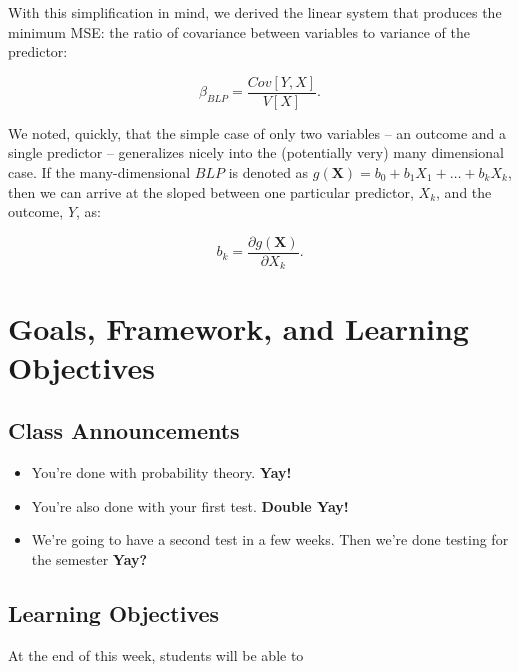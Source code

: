 \documentclass[
]{book}
\providecommand{\tightlist}{%
  \setlength{\itemsep}{0pt}\setlength{\parskip}{0pt}}
\theoremstyle{definition}
\theoremstyle{definition}
\theoremstyle{definition}
\theoremstyle{definition}
\theoremstyle{remark}
\begin{document}
With this simplification in mind, we derived the linear system that produces the minimum MSE: the ratio of covariance between variables to variance of the predictor:

\[
  \beta_{BLP} = \frac{Cov[Y,X]}{V[X]}. 
\]

We noted, quickly, that the simple case of only two variables -- an outcome and a single predictor -- generalizes nicely into the (potentially very) many dimensional case. If the many-dimensional \(BLP\) is denoted as \(g(\mathbf{X}) = b_{0} + b_{1}X_{1} + \dots + b_{k}X_{k}\), then we can arrive at the sloped between one particular predictor, \(X_{k}\), and the outcome, \(Y\), as:

\[
  b_{k} = \frac{\partial g(\mathbf{X})}{\partial X_{k}}. 
\]

\hypertarget{goals-framework-and-learning-objectives}{%
\section{Goals, Framework, and Learning Objectives}\label{goals-framework-and-learning-objectives}}

\hypertarget{class-announcements-3}{%
\subsection{Class Announcements}\label{class-announcements-3}}

\begin{itemize}
\tightlist
\item
  You're done with probability theory. \textbf{Yay!}
\item
  You're also done with your first test. \textbf{Double Yay!}
\item
  We're going to have a second test in a few weeks. Then we're done testing for the semester \textbf{Yay?}
\end{itemize}

\hypertarget{learning-objectives-4}{%
\subsection{Learning Objectives}\label{learning-objectives-4}}

At the end of this week, students will be able to
\end{document}
